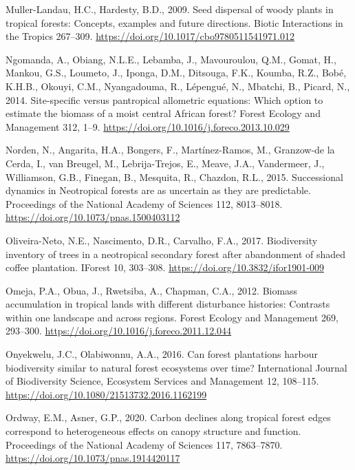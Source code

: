 \documentclass[
  12pt,
]{article}
\newlength{\cslhangindent}
\newlength{\cslentryspacingunit} %
\newenvironment{CSLReferences}[2] %
 {%
  \setlength{\parindent}{0pt}
  \ifodd #1
  \let\oldpar\par
  \def\par{\hangindent=\cslhangindent\oldpar}
  \fi
  \setlength{\parskip}{#2\cslentryspacingunit}
 }%
 {}
\begin{document}
\begin{CSLReferences}{1}{0}
\leavevmode{}%
Muller-Landau, H.C., Hardesty, B.D., 2009. Seed dispersal of woody plants in tropical forests: Concepts, examples and future directions. Biotic Interactions in the Tropics 267--309. \url{https://doi.org/10.1017/cbo9780511541971.012}

\leavevmode{}%
Ngomanda, A., Obiang, N.L.E., Lebamba, J., Mavouroulou, Q.M., Gomat, H., Mankou, G.S., Loumeto, J., Iponga, D.M., Ditsouga, F.K., Koumba, R.Z., Bobé, K.H.B., Okouyi, C.M., Nyangadouma, R., Lépengué, N., Mbatchi, B., Picard, N., 2014. Site-specific versus pantropical allometric equations: {Which} option to estimate the biomass of a moist central {African} forest? Forest Ecology and Management 312, 1--9. \url{https://doi.org/10.1016/j.foreco.2013.10.029}

\leavevmode{}%
Norden, N., Angarita, H.A., Bongers, F., Martínez-Ramos, M., Granzow-de la Cerda, I., van Breugel, M., Lebrija-Trejos, E., Meave, J.A., Vandermeer, J., Williamson, G.B., Finegan, B., Mesquita, R., Chazdon, R.L., 2015. Successional dynamics in {Neotropical} forests are as uncertain as they are predictable. Proceedings of the National Academy of Sciences 112, 8013--8018. \url{https://doi.org/10.1073/pnas.1500403112}

\leavevmode{}%
Oliveira-Neto, N.E., Nascimento, D.R., Carvalho, F.A., 2017. Biodiversity inventory of trees in a neotropical secondary forest after abandonment of shaded coffee plantation. IForest 10, 303--308. \url{https://doi.org/10.3832/ifor1901-009}

\leavevmode{}%
Omeja, P.A., Obua, J., Rwetsiba, A., Chapman, C.A., 2012. Biomass accumulation in tropical lands with different disturbance histories: {Contrasts} within one landscape and across regions. Forest Ecology and Management 269, 293--300. \url{https://doi.org/10.1016/j.foreco.2011.12.044}

\leavevmode{}%
Onyekwelu, J.C., Olabiwonnu, A.A., 2016. Can forest plantations harbour biodiversity similar to natural forest ecosystems over time? International Journal of Biodiversity Science, Ecosystem Services and Management 12, 108--115. \url{https://doi.org/10.1080/21513732.2016.1162199}

\leavevmode{}%
Ordway, E.M., Asner, G.P., 2020. Carbon declines along tropical forest edges correspond to heterogeneous effects on canopy structure and function. Proceedings of the National Academy of Sciences 117, 7863--7870. \url{https://doi.org/10.1073/pnas.1914420117}


\end{CSLReferences}
\end{document}

